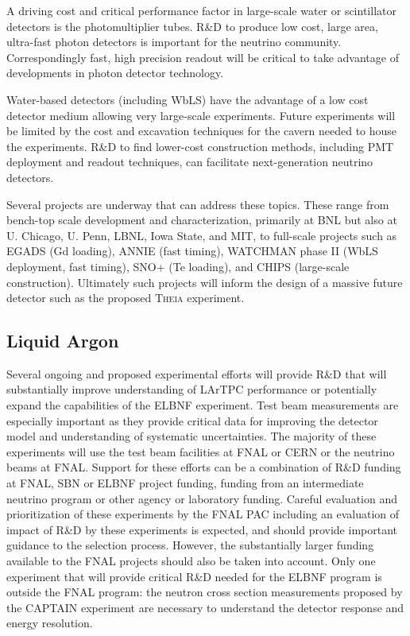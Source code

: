 A driving cost and critical performance factor in large-scale water or scintillator detectors is the 
photomultiplier tubes. R\&D to produce low cost, large area, ultra-fast photon detectors is important for 
the neutrino community. Correspondingly fast, high precision readout will be critical to take advantage of 
developments in photon detector technology.

Water-based detectors (including WbLS) have the advantage of a low cost detector medium allowing 
very large-scale experiments. Future experiments will be limited by the cost and excavation techniques 
for the cavern needed to house the experiments. R\&D to find lower-cost construction methods, including 
PMT deployment and readout techniques, can facilitate next-generation neutrino detectors.

Several projects are underway that can address these topics. These range from bench-top scale 
development and characterization, primarily at BNL but also at U. Chicago, U. Penn, LBNL, Iowa State, 
and MIT, to full-scale projects such as EGADS (Gd loading), ANNIE (fast timing), WATCHMAN phase II 
(WbLS deployment, fast timing), SNO+ (Te loading), and CHIPS (large-scale construction). Ultimately 
such projects will inform the design of a massive future detector such as the proposed \textsc{Theia} 
experiment.


\subsection{Liquid Argon}

Several ongoing and proposed experimental efforts will provide R\&D that will 
substantially improve understanding of LArTPC performance or potentially expand the 
capabilities of the ELBNF experiment. Test beam measurements are especially important as they 
provide critical data for improving the detector model and understanding of systematic uncertainties. 
The majority of these experiments will use the test beam facilities at FNAL or CERN or the neutrino 
beams at FNAL. Support for these efforts can be a combination of R\&D funding at FNAL, SBN or 
ELBNF project funding, funding from an intermediate neutrino program or other agency or laboratory funding. 
Careful evaluation and prioritization of these experiments by the FNAL PAC including an evaluation of 
impact of R\&D by these experiments is expected, and should provide important guidance to the 
selection process. However, the substantially larger funding available to the FNAL projects should also 
be taken into account. Only one experiment that will provide critical R\&D needed for the ELBNF 
program is outside the FNAL program: the neutron cross section measurements proposed by the 
CAPTAIN experiment are necessary to understand the detector response and energy resolution.


